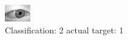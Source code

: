 \begin{figure}[h!]
\begin{center}
\includegraphics[width=0.60\columnwidth]{figures/ID2765_class_2_target_1.png}
\end{center}
\caption{ Classification: 2 actual target: 1}
\label{fig:ID2765_class_2_target_1}
\end{figure}
